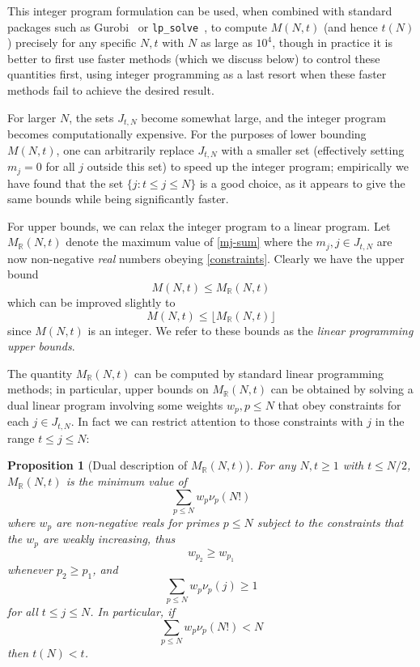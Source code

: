 \documentclass[10pt,a4paper,reqno]{amsart}
\numberwithin{equation}{section}
\theoremstyle{plain}
\newtheorem{proposition}[proposition]{Proposition}
\theoremstyle{definition}
\newcommand\R{\mathbb{R}}
\begin{document}
This integer program formulation can be used, when combined with standard packages such as Gurobi~\cite{gurobi} or \texttt{lp\_solve}~\cite{lpsolve}, to compute $M(N,t)$ (and hence $t(N)$) precisely for any specific $N,t$ with $N$ as large as $10^4$, though in practice it is better to first use faster methods (which we discuss below) to control these quantities first, using integer programming as a last resort when these faster methods fail to achieve the desired result.

For larger $N$, the sets $J_{t,N}$ become somewhat large, and the integer program becomes computationally expensive.  For the purposes of lower bounding $M(N,t)$, one can arbitrarily replace $J_{t,N}$ with a smaller set (effectively setting $m_j=0$ for all $j$ outside this set) to speed up the integer program; empirically we have found that the set $\{ j: t \leq j \leq N \}$ is a good choice, as it appears to give the same bounds while being significantly faster.

For upper bounds, we can relax the integer program to a linear program.  Let $M_\R(N,t)$ denote the maximum value of \eqref{mj-sum} where the $m_j, j \in J_{t,N}$ are now non-negative \emph{real} numbers obeying \eqref{constraints}.  Clearly we have the upper bound
$$ M(N,t) \leq M_\R(N,t)$$
which can be improved slightly to
\begin{equation}\label{lp-upper}
  M(N,t) \leq \lfloor M_\R(N,t)\rfloor
\end{equation}
since $M(N,t)$ is an integer.  We refer to these bounds as the \emph{linear programming upper bounds}.

The quantity $M_\R(N,t)$ can be computed by standard linear programming methods; in particular, upper bounds on $M_\R(N,t)$ can be obtained by solving a dual linear program involving some weights $w_p, p \leq N$ that obey constraints for each $j \in J_{t,N}$.  In fact we can restrict attention to those constraints with $j$ in the range $t \leq j \leq N$:

\begin{proposition}[Dual description of $M_\R(N,t)$]\label{dual-desc} For any $N,t \geq 1$ with $t \leq N/2$, $M_\R(N,t)$ is the minimum value of
\begin{equation}\label{hyp}
    \sum_{p \leq N} w_p \nu_p(N!)
\end{equation}
where $w_p$ are non-negative reals for primes $p \leq N$
subject to the constraints that the $w_p$ are weakly increasing, thus
\begin{equation}\label{wp-decrease}
w_{p_2} \geq w_{p_1}
\end{equation}
whenever $p_2 \geq p_1$, and
\begin{equation}\label{pj}
  \sum_{p \leq N} w_p \nu_p(j) \geq 1
 \end{equation}
for all $t \leq j \leq N$.  In particular, if
\begin{equation}\label{hyp-low}
  \sum_{p \leq N} w_p \nu_p(N!) < N
\end{equation}
then $t(N) < t$.
\end{proposition}
\end{document}
